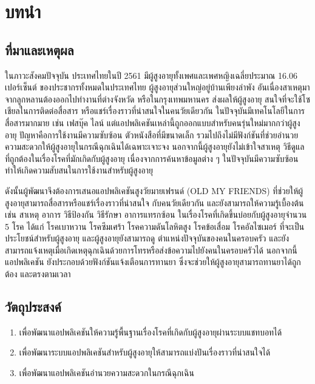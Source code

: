 \chapter{บทนำ}

\section{ที่มาและเหตุผล}
ในภาวะสังคมปัจจุบัน ประเทศไทยในปี 2561 มีผู้สูงอายุทั้งเพศและเพศหญิงเฉลี่ยประมาณ 16.06 เปอร์เซ็นต์ ของประชากรทั้งหมดในประเทศไทย \cite{dop} 
ผู้สูงอายุส่วนใหญ่อยู่บ้านเพียงลำพัง อันเนื่องสาเหตุมาจากลูกหลานต้องออกไปทำงานที่ต่างจังหวัด หรือในกรุงเทพมหานคร ส่งผลให้ผู้สูงอายุ
สนใจที่จะใช้โซเชียลในการติดต่อสื่อสาร หรือแชร์เรื่องราวที่น่าสนใจในคนวัยเดียวกัน ในปัจจุบันมีเทคโนโลยีในการสื่อสารมากมาย เช่น เฟสบุ๊ค ไลน์
แต่แอปพลิเคชันเหล่านี้ถูกออกแบบสำหรับคนรุ่นใหม่มากกว่าผู้สูงอายุ ปัญหาคือการใช้งานมีความซับซ้อน ตัวหนังสือที่มีขนาดเล็ก 
รวมไปถึงไม่มีฟังก์ชันที่ช่วยอำนวยความสะดวกให้ผู้สูงอายุในกรณีฉุกเฉินได้เฉพาะเจาะจง นอกจากนี้ผู้สูงอายุยังไม่เข้าใจสาเหตุ วิธีดูแล ที่ถูกต้องในเรื่องโรคที่มักเกิดกับผู้สูงอายุ 
เนื่องจากการค้นหาข้อมูลต่าง ๆ ในปัจจุบันมีความซับซ้อน ทำให้เกิดความสับสนในการใช้งานสำหรับผู้สูงอายุ

ดังนั้นผู้พัฒนาจึงต้องการเสนอแอปพลิเคชันสูงวัยมายเฟรนด์ (OLD MY FRIENDS) ที่ช่วยให้ผู้สูงอายุสามารถสื่อสารหรือแชร์เรื่องราวที่น่าสนใจ
กับคนวัยเดียวกัน และยังสามารถให้ความรู้เบื้องต้น เช่น สาเหตุ อาการ วิธีป้องกัน วิธีรักษา อาการแทรกซ้อน ในเรื่องโรคที่เกิดขึ้นบ่อยกับผู้สูงอายุจำนวน 5 โรค \cite{thaihealth} ได้แก่ 
โรคเบาหวาน โรคซึมเศร้า โรคความดันโลหิตสูง โรคข้อเสื่อม โรคอัลไซเมอร์ ที่จะเป็นประโยชน์สำหรับผู้สูงอายุ และผู้สูงอายุยังสามารถดู
ตำแหน่งปัจจุบันของคนในครอบครัว และยังสามารถแจ้งเหตุเมื่อเกิดเหตุฉุกเฉินด้วยการโทรหรือส่งข้อความไปยังคนในครอบครัวได้ นอกจากนี้
แอปพลิเคชัน ยังประกอบด้วยฟังก์ชันแจ้งเตือนการทานยา ซึ่งจะช่วยให้ผู้สูงอายุสามารถทานยาได้ถูกต้อง และตรงตามเวลา

\section{วัตถุประสงค์}
\begin{enumerate}
	\item เพื่อพัฒนาแอปพลิเคชันให้ความรู้พื้นฐานเรื่องโรคที่เกิดกับผู้สูงอายุผ่านระบบแชทบอทได้
	\item เพื่อพัฒนาระบบแอปพลิเคชันสำหรับผู้สูงอายุให้สามารถแบ่งปันเรื่องราวที่น่าสนใจได้
	\item เพื่อพัฒนาแอปพลิเคชันอำนวยความสะดวกในกรณีฉุกเฉิน
\end{enumerate}
